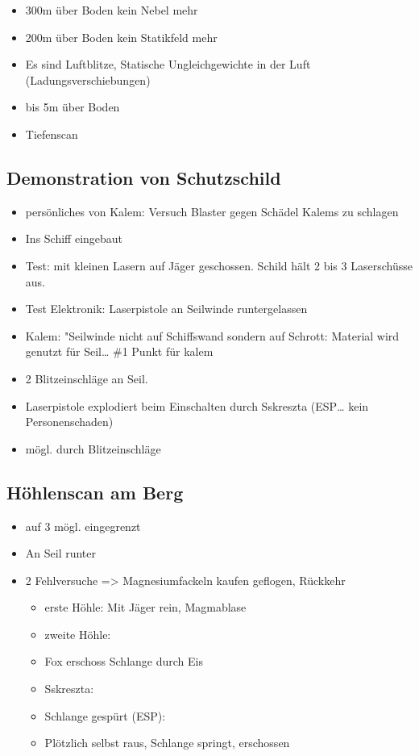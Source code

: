 \documentclass[11pt]{scrartcl}
\begin{document}
\begin{itemize}
\item
  300m über Boden kein Nebel mehr
\item
  200m über Boden kein Statikfeld mehr
\item
  Es sind Luftblitze, Statische Ungleichgewichte in der Luft
  (Ladungsverschiebungen)
\item
  bis 5m über Boden
\item
  Tiefenscan
\end{itemize}
\subsection{Demonstration von Schutzschild}

\begin{itemize}
\item
  persönliches von Kalem: Versuch Blaster gegen Schädel Kalems zu
  schlagen
\item
  Ins Schiff eingebaut
\item
  Test: mit kleinen Lasern auf Jäger geschossen. Schild hält 2 bis 3
  Laserschüsse aus.
\item
  Test Elektronik: Laserpistole an Seilwinde runtergelassen
\item
  Kalem: "Seilwinde nicht auf Schiffswand sondern auf Schrott: Material
  wird genutzt für Seil\ldots{} \#1 Punkt für kalem
\item
  2 Blitzeinschläge an Seil.
\item
  Laserpistole explodiert beim Einschalten durch Sskreszta (ESP\ldots{}
  kein Personenschaden)
\item
  mögl. durch Blitzeinschläge
\end{itemize}
\subsection{Höhlenscan am Berg}

\begin{itemize}
\item
  auf 3 mögl. eingegrenzt
\item
  An Seil runter
\item
  2 Fehlversuche =\textgreater{} Magnesiumfackeln kaufen geflogen,
  Rückkehr
  \begin{itemize}
  \item
    erste Höhle: Mit Jäger rein, Magmablase
  \item
    zweite Höhle:
  \item
    Fox erschoss Schlange durch Eis
  \item
    Sskreszta:
  \item
    Schlange gespürt (ESP):
  \item
    Plötzlich selbst raus, Schlange springt, erschossen
  \end{itemize}
\end{itemize}
\end{document}
